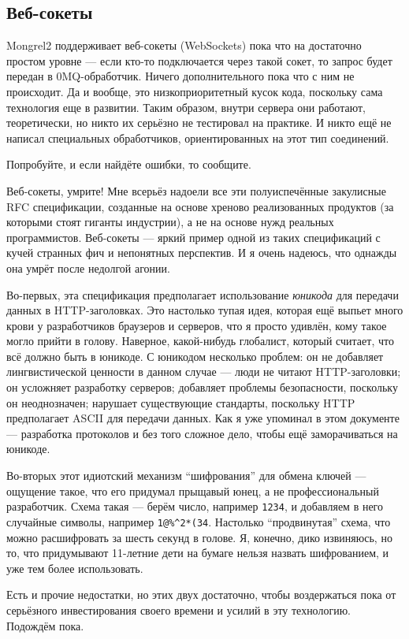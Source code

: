 \subsection{Веб-сокеты}

Mongrel2 поддерживает веб-сокеты (WebSockets) пока что на достаточно простом
уровне --- если кто-то подключается через такой сокет, то запрос будет передан в
0MQ-обработчик.  Ничего дополнительного пока что с ним не происходит. Да и
вообще, это низкоприоритетный кусок кода, поскольку сама технология еще в
развитии. Таким образом, внутри сервера они работают, теоретически, но никто их
серьёзно не тестировал на практике. И никто ещё не написал специальных
обработчиков, ориентированных на этот тип соединений.

Попробуйте, и если найдёте ошибки, то сообщите.

\begin{aside}{Веб-сокеты, умрите!}
Мне всерьёз надоели все эти полуиспечённые закулисные RFC спецификации,
созданные на основе хреново реализованных продуктов (за которыми стоят гиганты
индустрии), а не на основе нужд реальных программистов. Веб-сокеты --- яркий
пример одной из таких спецификаций с кучей странных фич и непонятных перспектив.
И я очень надеюсь, что однажды она умрёт после недолгой агонии.

Во-первых, эта спецификация предполагает использование \emph{юникода} для
передачи данных в HTTP-заголовках. Это настолько тупая идея, которая ещё выпьет
много крови у разработчиков браузеров и серверов, что я просто удивлён, кому
такое могло прийти в голову. Наверное, какой-нибудь глобалист, который считает,
что всё должно быть в юникоде. С юникодом несколько проблем: он не добавляет
лингвистической ценности в данном случае --- люди не читают HTTP-заголовки; он
усложняет разработку серверов; добавляет проблемы безопасности, поскольку он
неоднозначен; нарушает существующие стандарты, поскольку HTTP предполагает ASCII
для передачи данных. Как я уже упоминал в этом документе --- разработка
протоколов и без того сложное дело, чтобы ещё заморачиваться на юникоде.

Во-вторых этот идиотский механизм ``шифрования'' для обмена ключей --- ощущение
такое, что его придумал прыщавый юнец, а не профессиональный разработчик. Схема
такая --- берём число, например \verb|1234|, и добавляем в него случайные
символы, например \verb|1@%^2*(34|. Настолько ``продвинутая'' схема, что можно
расшифровать за шесть секунд в голове. Я, конечно, дико извиняюсь, но то, что
придумывают 11-летние дети на бумаге нельзя назвать шифрованием, и уже тем более
использовать.

Есть и прочие недостатки, но этих двух достаточно, чтобы воздержаться пока от
серьёзного инвестирования своего времени и усилий в эту технологию. Подождём
пока.
\end{aside}

